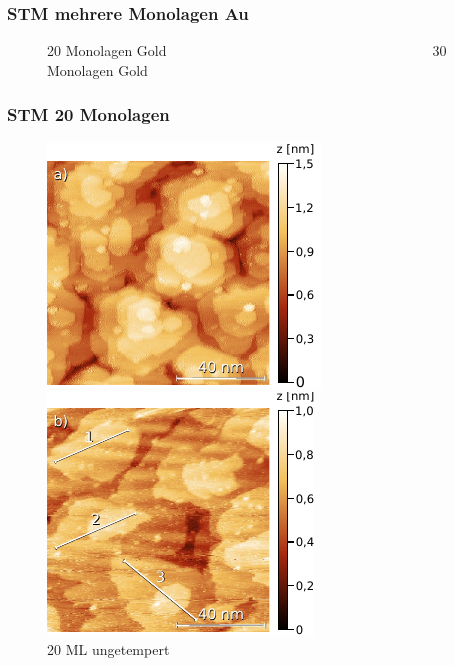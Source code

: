 \documentclass{beamer}
\begin{document}
\begin{frame}
\frametitle{STM mehrere Monolagen Au}
\begin{figure}[H]
	\begin{minipage}[b]{0.45\textwidth} 
		
	\end{minipage}
	\hspace{0.5cm} 
	\begin{minipage}[b]{0.45\textwidth}
		
	\end{minipage}
\caption*{20 Monolagen Gold~~~~~~~~~~~~~~~~~~~~~~~~~~~~~~~~~~~~~~30 Monolagen Gold}
\end{figure}
\end{frame}

\begin{frame}
\frametitle{STM 20 Monolagen}
\vspace{-0.3cm}
\begin{figure}[H]
	\begin{minipage}[b]{0.45\textwidth} 
		\includegraphics{bilder/20ML_2kleiner}
		\caption*{20 ML ungetempert}
	\end{minipage}
	\hspace{0.5cm} 
	\begin{minipage}[b]{0.45\textwidth}
		\includegraphics{bilder/20MLget2kleiner}

\end{minipage}
\end{figure}
\end{frame}
\end{document}
